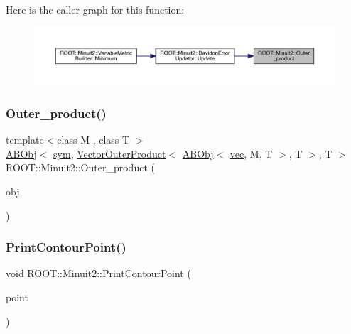 Here is the caller graph for this function\+:
\nopagebreak
\begin{figure}[H]
\begin{center}
\leavevmode
\includegraphics[width=350pt]{d6/d3a/namespaceROOT_1_1Minuit2_a2f3a76ab9b1a9a2ed58cfdc8de6ff704_icgraph}
\end{center}
\end{figure}
\mbox{\label{namespaceROOT_1_1Minuit2_af2403945113672e7581188addb96ff15}} 
\subsubsection{\texorpdfstring{Outer\_product()}{Outer\_product()}\hspace{0.1cm}{\footnotesize\ttfamily [2/2]}}
{\footnotesize\ttfamily template$<$class M , class T $>$ \\
\mbox{\hyperlink{classROOT_1_1Minuit2_1_1ABObj}{A\+B\+Obj}}$<$ \mbox{\hyperlink{classROOT_1_1Minuit2_1_1sym}{sym}}, \mbox{\hyperlink{classROOT_1_1Minuit2_1_1VectorOuterProduct}{Vector\+Outer\+Product}}$<$ \mbox{\hyperlink{classROOT_1_1Minuit2_1_1ABObj}{A\+B\+Obj}}$<$ \mbox{\hyperlink{classROOT_1_1Minuit2_1_1vec}{vec}}, M, T $>$, T $>$, T $>$ R\+O\+O\+T\+::\+Minuit2\+::\+Outer\+\_\+product (\begin{DoxyParamCaption}\item[{const \mbox{\hyperlink{classROOT_1_1Minuit2_1_1ABObj}{A\+B\+Obj}}$<$ \mbox{\hyperlink{classROOT_1_1Minuit2_1_1vec}{vec}}, M, T $>$ \&}]{obj }\end{DoxyParamCaption})\hspace{0.3cm}{\ttfamily [inline]}}

\mbox{\label{namespaceROOT_1_1Minuit2_a4075583a4cbc4a719ed2ec32e1d76bbf}} 
\subsubsection{\texorpdfstring{PrintContourPoint()}{PrintContourPoint()}}
{\footnotesize\ttfamily void R\+O\+O\+T\+::\+Minuit2\+::\+Print\+Contour\+Point (\begin{DoxyParamCaption}\item[{const std\+::pair$<$ double, double $>$ \&}]{point }\end{DoxyParamCaption})}

